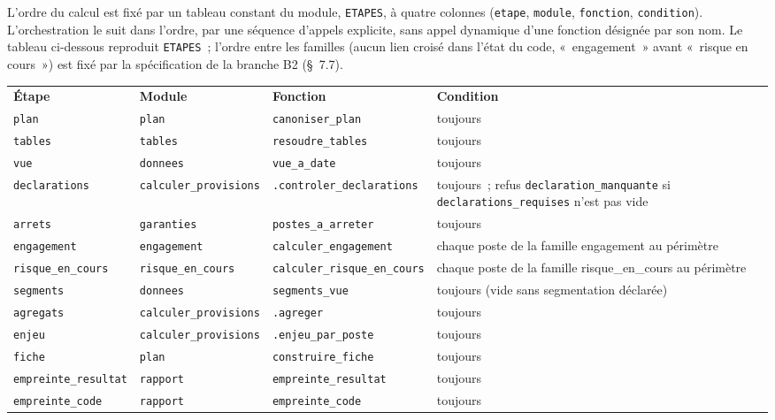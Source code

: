 \documentclass[a4paper,11pt]{article}
\newcommand{\code}[1]{\texttt{\small #1}}
\begin{document}
L'ordre du calcul est fixé par un tableau constant du module,
\code{ETAPES}, à quatre colonnes (\code{etape}, \code{module},
\code{fonction}, \code{condition}). L'orchestration le suit dans l'ordre,
par une séquence d'appels explicite, sans appel dynamique d'une fonction
désignée par son nom. Le tableau ci-dessous reproduit \code{ETAPES}~;
l'ordre entre les familles (aucun lien croisé dans l'état du code,
«~engagement~» avant «~risque en cours~») est fixé par la spécification de
la branche B2 (§~7.7).

\begin{center}
\small
{}
\begin{tabular}{@{}p{3.4cm}p{3.55cm}p{4.5cm}>{\raggedright\arraybackslash}p{3.25cm}@{}}
\rowcolor{tableheader}
\textcolor{financeblue}{\textbf{Étape}} & \textcolor{financeblue}{\textbf{Module}} & \textcolor{financeblue}{\textbf{Fonction}} & \textcolor{financeblue}{\textbf{Condition}} \\
\code{plan} & \code{plan} & \code{canoniser\_plan} & toujours \\
\code{tables} & \code{tables} & \code{resoudre\_tables} & toujours \\
\code{vue} & \code{donnees} & \code{vue\_a\_date} & toujours \\
\code{declarations} & \code{calculer\_provisions} & \code{.controler\_declarations} & toujours~; refus \code{declaration\_\allowbreak manquante} si \code{declarations\_\allowbreak requises} n'est pas vide \\
\code{arrets} & \code{garanties} & \code{postes\_a\_arreter} & toujours \\
\code{engagement} & \code{engagement} & \code{calculer\_engagement} & chaque poste de la famille engagement au périmètre \\
\code{risque\_en\_cours} & \code{risque\_en\_cours} & \code{calculer\_risque\_en\_cours} & chaque poste de la famille risque\_en\_cours au périmètre \\
\code{segments} & \code{donnees} & \code{segments\_vue} & toujours (vide sans segmentation déclarée) \\
\code{agregats} & \code{calculer\_provisions} & \code{.agreger} & toujours \\
\code{enjeu} & \code{calculer\_provisions} & \code{.enjeu\_par\_poste} & toujours \\
\code{fiche} & \code{plan} & \code{construire\_fiche} & toujours \\
\code{empreinte\_resultat} & \code{rapport} & \code{empreinte\_resultat} & toujours \\
\code{empreinte\_code} & \code{rapport} & \code{empreinte\_code} & toujours \\
\end{tabular}
\end{center}
\end{document}
